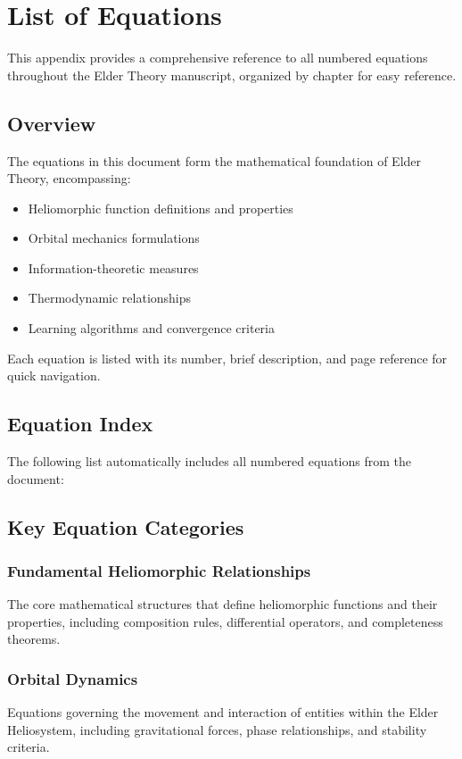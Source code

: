 \chapter{List of Equations}

This appendix provides a comprehensive reference to all numbered equations throughout the Elder Theory manuscript, organized by chapter for easy reference.

\section{Overview}

The equations in this document form the mathematical foundation of Elder Theory, encompassing:
\begin{itemize}
    \item Heliomorphic function definitions and properties
    \item Orbital mechanics formulations
    \item Information-theoretic measures
    \item Thermodynamic relationships
    \item Learning algorithms and convergence criteria
\end{itemize}

Each equation is listed with its number, brief description, and page reference for quick navigation.

\section{Equation Index}

The following list automatically includes all numbered equations from the document:

\listofequations

\section{Key Equation Categories}

\subsection{Fundamental Heliomorphic Relationships}
The core mathematical structures that define heliomorphic functions and their properties, including composition rules, differential operators, and completeness theorems.

\subsection{Orbital Dynamics}
Equations governing the movement and interaction of entities within the Elder Heliosystem, including gravitational forces, phase relationships, and stability criteria.

